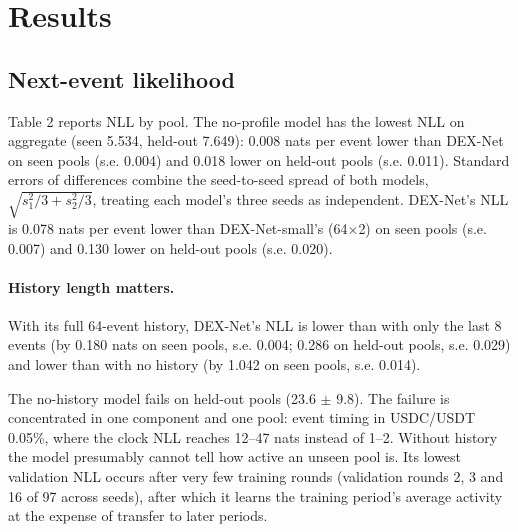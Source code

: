 \documentclass[11pt]{article}
\begin{document}
\section{Results}

\subsection{Next-event likelihood}

Table 2 reports NLL by pool. The no-profile model has the lowest NLL on aggregate (seen 5.534, held-out 7.649): 0.008 nats per event lower than DEX-Net on seen pools (s.e. 0.004) and 0.018 lower on held-out pools (s.e. 0.011). Standard errors of differences combine the seed-to-seed spread of both models, $\sqrt{s_1^2/3 + s_2^2/3}$, treating each model's three seeds as independent. DEX-Net's NLL is 0.078 nats per event lower than DEX-Net-small's (64\ensuremath{\times}2) on seen pools (s.e. 0.007) and 0.130 lower on held-out pools (s.e. 0.020).

\paragraph{History length matters.} With its full 64-event history, DEX-Net's NLL is lower than with only the last 8 events (by 0.180 nats on seen pools, s.e. 0.004; 0.286 on held-out pools, s.e. 0.029) and lower than with no history (by 1.042 on seen pools, s.e. 0.014).

The no-history model fails on held-out pools (23.6 \ensuremath{\pm} 9.8). The failure is concentrated in one component and one pool: event timing in USDC/USDT 0.05\%, where the clock NLL reaches 12--47 nats instead of 1--2. Without history the model presumably cannot tell how active an unseen pool is. Its lowest validation NLL occurs after very few training rounds (validation rounds 2, 3 and 16 of 97 across seeds), after which it learns the training period's average activity at the expense of transfer to later periods.
\end{document}
